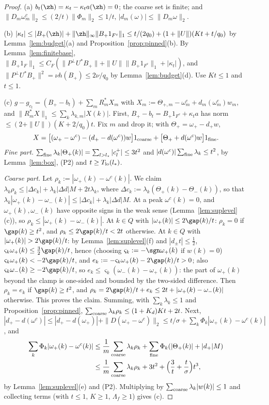 \begin{proof}
(a) $b_t(\zh)=\kappa_t-\kappa_ta(\zh)=0$; the coarse set is finite; and
$\|D_m\omega^c_m\|_2\le(2/t)\|\Phi_m\|_2\le1/t$, $|d_m(\omega)|\le
\|D_m\omega\|_2$.

(b) $|\kappa_t|\le|B_+(\zh)|+\|\zh\|_\infty\|B_+1_{F^c}\|_1\le t/(2q_0)+
(1+\|U\|)(Kt+t/q_0)$ by Lemma~\ref{lem:budget}(a) and
Proposition~\ref{prop:pinned}(b).  By Lemma~\ref{lem:finitebase},
$\|B_+1_F\|_1\le C_F(\|P^\perp U^*B_+\|+\|U\|\|B_+1_{F^c}\|_1+|\kappa_t|)$,
and $\|P^\perp U^*B_+\|^2=\nu h(B_+)\le2\nu/q_0$ by
Lemma~\ref{lem:budget}(d).  Use $Kt\le1$ and $t\le1$.

(c) $g-g_{c_t}=(B_+-b_t)+\sum_mR_m^*X_m$ with $X_m:=\Theta_{+,m}-\omega^c_m+
d_m(\omega^c_m)w_m$, and $\|R^*_mX\|_1\le\sum_k\lambda_{k,m}|X(k)|$.  First,
$B_+-b_t=B_+1_{F^c}+\kappa_ta$ has norm $\le(2+\|U\|)(K+2/q_0)t$.  Fix $m$
and drop it; with $\Theta_+=\omega_+-d_+w$,
\[
 X=\big[(\omega_+-\omega^c)-(d_+-d(\omega^c))w\big]1_{\rm coarse}+
 \big[\Theta_++d(\omega^c)w\big]1_{\rm fine}.
\]
\emph{Fine part.}  $\sum_{\rm fine}\lambda_k|\Theta_+(k)|=\sum_{l>l_*}
|c^+_l|\le3t^2$ and $|d(\omega^c)|\sum_{\rm fine}\lambda_k\le t^2$, by
Lemma~\ref{lem:box}, (P2) and $t\ge T_{\rm lo}(l_*)$.

\emph{Coarse part.}  Let $\rho_k:=|\omega_+(k)-\omega^c(k)|$.  We claim
$\lambda_k\rho_k\le|\Delta c_k|+\lambda_k|\Delta d|M+2t\lambda_k$, where
$\Delta c_k:=\lambda_k(\Theta_+(k)-\Theta_-(k))$, so that
$\lambda_k|\omega_+(k)-\omega_-(k)|\le|\Delta c_k|+\lambda_k|\Delta d|M$.
At a peak $\omega^c(k)=0$, and $\omega_+(k),\omega_-(k)$ have opposite signs
in the weak sense (Lemma~\ref{lem:suplevel}(c)), so $\rho_k\le|\omega_+(k)-
\omega_-(k)|$.  At $k\in Q$ with $|\omega_+(k)|\le2\gap(k)/t$: $\rho_k=0$ if
$\gap(k)\ge t^2$, and $\rho_k\le2\gap(k)/t<2t$ otherwise.  At $k\in Q$ with
$|\omega_+(k)|>2\gap(k)/t$: by Lemma~\ref{lem:suplevel}(f) and $|d_\pm t|\le
\frac12$, $\varsigma_k\omega_+(k)\le\frac32\gap(k)/t$, hence (choosing
$\varsigma_k:=-\sgn\omega_+(k)$ if $w(k)=0$) $\varsigma_k\omega_+(k)<
-2\gap(k)/t$, and $e_k:=-\varsigma_k\omega_+(k)-2\gap(k)/t>0$; also
$\varsigma_k\omega_-(k)\ge-2\gap(k)/t$, so $e_k\le\varsigma_k(\omega_-(k)-
\omega_+(k))$: the part of $\omega_+(k)$ beyond the clamp is one-sided and
bounded by the two-sided difference.  Then $\rho_k=e_k$ if $\gap(k)\ge t^2$,
and $\rho_k=2\gap(k)/t+e_k\le2t+|\omega_+(k)-\omega_-(k)|$ otherwise.  This
proves the claim.  Summing, with $\sum_k\lambda_k\le1$ and
Proposition~\ref{prop:pinned}, $\sum_{\rm coarse}\lambda_k\rho_k\le
(1+K_d)Kt+2t$.  Next, $|d_+-d(\omega^c)|\le|d_+-d(\omega_+)|+\|D(\omega_+-
\omega^c)\|_2\le t/\sigma+\sum_k\Phi_k|\omega_+(k)-\omega^c(k)|$, and
\begin{align*}
 \sum_k\Phi_k|\omega_+(k)-\omega^c(k)|&\le\frac1m\sum_{\rm coarse}
 \lambda_k\rho_k+\sum_{\rm fine}\Phi_k(|\Theta_+(k)|+|d_+|M)\\
 &\le\frac1m\sum_{\rm coarse}\lambda_k\rho_k+3t^2+\Big(\frac3t+\frac
 t\sigma\Big)t^3,
\end{align*}
by Lemma~\ref{lem:suplevel}(e) and (P2).  Multiplying by
$\sum_{\rm coarse}\lambda_k|w(k)|\le1$ and collecting terms (with $t\le1$,
$K\ge1$, $\Lambda_f\ge1$) gives (c).


\end{proof}
